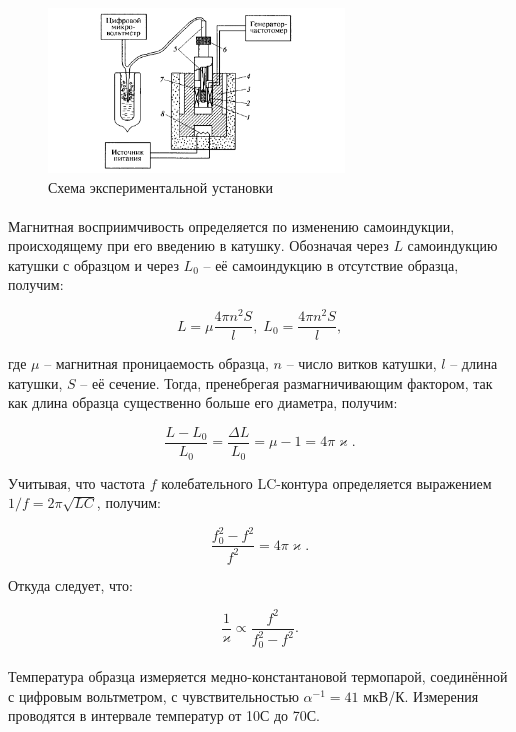 \documentclass[a4paper,12pt]{article} %
\begin{document}
\begin{figure}[h]
\centering
\includegraphics[width=0.7\textwidth]{setup.png}
\caption{Схема экспериментальной установки}
\label{fig:setup}
\end{figure}

\paragraph{}
	Магнитная восприимчивость определяется по изменению самоиндукции, происходящему при его введению в катушку. Обозначая через $L$ самоиндукцию катушки с образцом и через $L_0$ -- её самоиндукцию в отсутствие образца, получим:

\begin{equation}
L = \mu \frac{4 \pi n^2 S}{l}, \; L_0 = \frac{4 \pi n^2 S}{l},
\end{equation}

\noindent где $\mu$ -- магнитная проницаемость образца, $n$ --  число витков катушки, $l$ -- длина катушки, $S$ -- её сечение. Тогда, пренебрегая размагничивающим фактором, так как длина образца существенно больше его диаметра, получим:

\begin{equation}
\frac{L - L_0}{L_0} = \frac{\Delta L}{L_0} = \mu - 1 = 4 \pi \varkappa.
\end{equation}

\noindent Учитывая, что частота $f$ колебательного LC-контура определяется  выражением $1/f = 2 \pi \sqrt{LC}$, получим:

\begin{equation}
\frac{f_0^2 - f^2}{f^2} = 4 \pi \varkappa.
\end{equation}

\noindent Откуда следует, что:

\begin{equation}
\frac{1}{\varkappa} \propto \frac{f^2}{f_0^2 - f^2}.
\end{equation}

\paragraph{} 
	Температура образца измеряется медно-константановой термопарой, соединённой с цифровым вольтметром, с чувствительностью $\alpha^{-1} = 41$ мкВ/К. Измерения проводятся в интервале температур от 10\degree С до 70\degree С.
\end{document}
